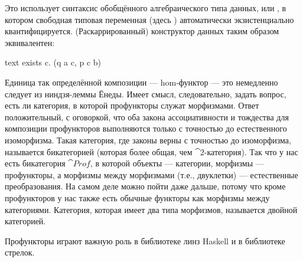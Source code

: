 Это использует синтаксис обобщённого алгебраического типа данных, или , в котором
свободная типовая переменная (здесь ) автоматически экзистенциально
квантифицируется. (Раскаррированный) конструктор данных 
таким образом эквивалентен:

\begin{snip}{text}
exists c. (q a c, p c b)
\end{snip}
Единица так определённой композиции --- hom-функтор --- это
немедленно следует из ниндзя-леммы Ёнеды. Имеет смысл,
следовательно, задать вопрос, есть ли категория, в которой
профункторы служат морфизмами. Ответ положительный, с оговоркой,
что оба закона ассоциативности и тождества для композиции профункторов
выполняются только с точностью до естественного изоморфизма. Такая категория, где законы
верны с точностью до изоморфизма, называется бикатегорией (которая более общая,
чем $\cat{2}$-категория). Так что у нас есть бикатегория $\cat{Prof}$, в которой
объекты --- категории, морфизмы --- профункторы, а морфизмы между
морфизмами (т.е., двуклетки) --- естественные преобразования. На самом деле можно
пойти даже дальше, потому что кроме профункторов у нас также есть обычные
функторы как морфизмы между категориями. Категория, которая имеет два типа
морфизмов, называется двойной категорией.

Профункторы играют важную роль в библиотеке линз Haskell и в
библиотеке стрелок.
